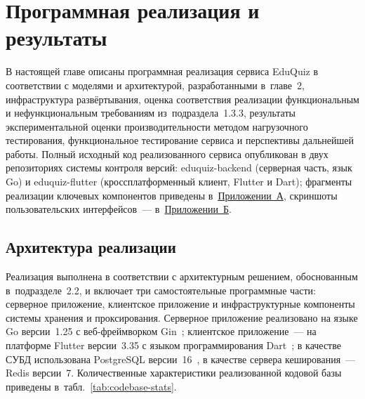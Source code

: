 \section[ПРОГРАММНАЯ РЕАЛИЗАЦИЯ И РЕЗУЛЬТАТЫ]{Программная реализация и результаты}
\thispagestyle{plain}

В настоящей главе описаны программная реализация сервиса EduQuiz
в соответствии с моделями и архитектурой, разработанными в~главе~2,
инфраструктура развёртывания, оценка соответствия реализации
функциональным и нефункциональным требованиям из~подраздела~1.3.3,
результаты экспериментальной оценки производительности методом
нагрузочного тестирования, функциональное тестирование сервиса
и перспективы дальнейшей работы. Полный исходный код реализованного
сервиса опубликован в двух репозиториях системы контроля версий:
eduquiz-backend (серверная часть, язык Go) и
eduquiz-flutter (кроссплатформенный клиент, Flutter
и Dart); фрагменты реализации ключевых компонентов приведены
в~\hyperref[application_A]{Приложении~А}, скриншоты пользовательских интерфейсов~--- в~\hyperref[application_B]{Приложении~Б}.

\subsection{Архитектура реализации}

Реализация выполнена в соответствии с архитектурным решением,
обоснованным в~подразделе~2.2, и включает три самостоятельные
программные части: серверное приложение, клиентское приложение
и инфраструктурные компоненты системы хранения и проксирования.
Серверное приложение реализовано на языке Go версии~1.25 с
веб-фреймворком Gin~\cite{gin_docs}; клиентское приложение~--- на
платформе Flutter версии~3.35 с языком программирования
Dart~\cite{flutter_docs}; в качестве СУБД использована PostgreSQL
версии~16~\cite{postgresql_docs}, в качестве сервера кеширования~---
Redis версии~7. Количественные характеристики реализованной кодовой
базы приведены в~табл.~\ref{tab:codebase-stats}.

